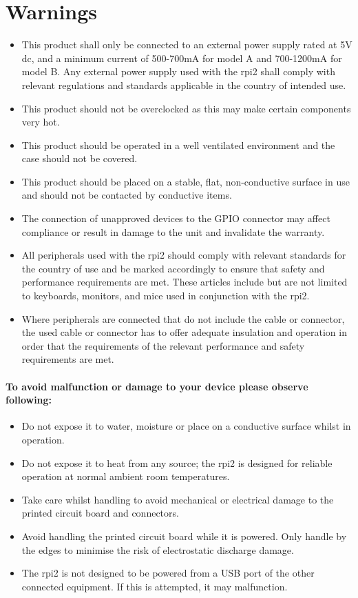 \section{Warnings}
\begin{itemize}
\item This product shall only be connected to an external power supply rated at 5V dc, and a minimum current of 500-700mA for model A and 700-1200mA for model B. Any external power supply used with the \gls{rpi2} shall comply with relevant regulations and standards applicable in the country of intended use. 
\item This product should not be overclocked as this may make certain components very hot. 
\item This product should be operated in a well ventilated environment and the case should not be covered. 
\item This product should be placed on a stable, flat, non-conductive surface in use and should not be contacted by conductive items. 
\item The connection of unapproved devices to the GPIO connector may affect compliance or result in damage to the unit and invalidate the warranty. 
\item All peripherals used with the \gls{rpi2} should comply with relevant standards for the country of use and be marked accordingly to ensure that safety and performance requirements are met. These articles include but are not limited to keyboards, monitors, and mice used in conjunction with the \gls{rpi2}.
\item Where peripherals are connected that do not include the cable or connector, the used cable or connector has to offer adequate insulation and operation in order that the requirements of the relevant performance and safety requirements are met.
\end{itemize}
\paragraph{To avoid malfunction or damage to your device please observe following:}
\begin{itemize}
\item Do not expose it to water, moisture or place on a conductive surface whilst in operation.
\item Do not expose it to heat from any source; the \gls{rpi2} is designed for reliable operation at normal ambient room temperatures.
\item Take care whilst handling to avoid mechanical or electrical damage to the printed circuit board and connectors.
\item Avoid handling the printed circuit board while it is powered. Only handle by the edges to minimise the risk of electrostatic discharge damage.
\item The \gls{rpi2} is not designed to be powered from a USB port of the other connected equipment. If this is attempted, it may malfunction.
\end{itemize}




